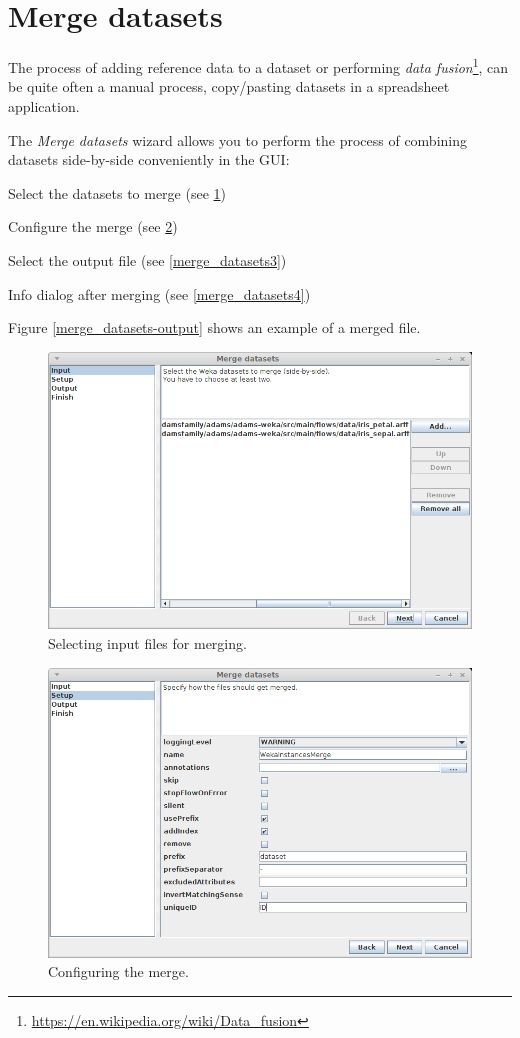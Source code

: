 \clearpage
\section{Merge datasets}
The process of adding reference data to a dataset or performing
\textit{data fusion}\footnote{\url{https://en.wikipedia.org/wiki/Data_fusion}{}},
can be quite often a manual process, copy/pasting datasets in a spreadsheet
application.

The \textit{Merge datasets} wizard allows you to perform the
process of combining datasets side-by-side conveniently in the GUI:
\begin{tight_itemize}
  \item Select the datasets to merge (see \ref{merge_datasets1})
  \item Configure the merge (see \ref{merge_datasets2})
  \item Select the output file (see \ref{merge_datasets3})
  \item Info dialog after merging (see \ref{merge_datasets4})
\end{tight_itemize}
Figure \ref{merge_datasets-output} shows an example of a merged file.

\begin{figure}[htb]
  \centering
  \includegraphics[width=12.0cm]{images/merge_datasets1.png}
  \caption{Selecting input files for merging.}
  \label{merge_datasets1}
\end{figure}

\begin{figure}[htb]
  \centering
  \includegraphics[width=12.0cm]{images/merge_datasets2.png}
  \caption{Configuring the merge.}
  \label{merge_datasets2}
\end{figure}

